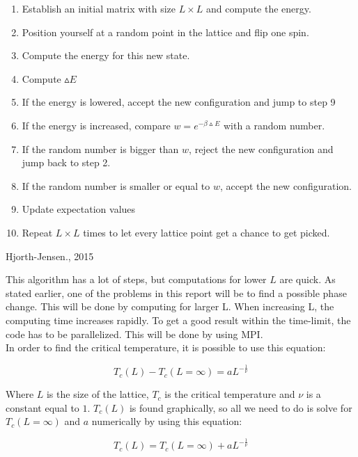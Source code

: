 \documentclass[10pt,a4paper]{article}
\begin{document}
\begin{enumerate}
\item Establish an initial matrix with size $L \times L$ and compute the energy.
\item Position yourself at a random point in the lattice and flip one spin.
\item Compute the energy for this new state.
\item Compute $\vartriangle E$ 
\item If the energy is lowered, accept the new configuration and jump to step 9
\item If the energy is increased, compare $w=e^{-\beta \vartriangle E}$ with a random number.
\item If the random number is bigger than $w$, reject the new configuration and jump back to step 2.
\item If the random number is smaller or equal to $w$, accept the new configuration. 
\item Update expectation values
\item Repeat $L \times L$ times to let every lattice point get a chance to get picked.
\end{enumerate}
\hfill{Hjorth-Jensen., 2015}

\vspace{1cm}
\noindent This algorithm has a lot of steps, but computations for lower $L$ are quick. As stated earlier, one of the problems in this report will be to find a possible phase change. This will be done by computing for larger L. When increasing L, the computing time increases rapidly. To get a good result within the time-limit, the code has to be parallelized. This will be done by using MPI.\\

\noindent In order to find the critical temperature, it is possible to use this equation:

\begin{equation}
T_c(L)-T_c(L=\infty)=aL^{-\frac{1}{\nu}}
\end{equation} 

\noindent Where $L$ is the size of the lattice, $T_c$ is the critical temperature and $\nu$ is a constant equal to $1$. $T_c(L)$ is found graphically, so all we need to do is solve for $T_c(L=\infty)$ and $a$ numerically by using this equation:


\begin{equation}
T_c(L)=T_c(L=\infty)+aL^{-\frac{1}{\nu}}
\end{equation}
\end{document}
